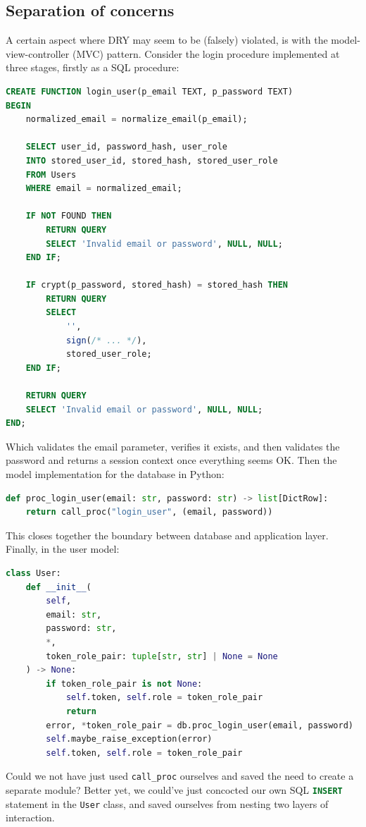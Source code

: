 \documentclass[journal]{IEEEtran}
\begin{document}
	\subsection{Separation of concerns}
	
	A certain aspect where DRY may seem to be (falsely) violated, is with the model-view-controller (MVC) pattern. Consider the login procedure implemented at three stages, firstly as a SQL procedure:
	
	\begin{lstlisting}[language=SQL]
CREATE FUNCTION login_user(p_email TEXT, p_password TEXT)
BEGIN
	normalized_email = normalize_email(p_email);
	
	SELECT user_id, password_hash, user_role
	INTO stored_user_id, stored_hash, stored_user_role
	FROM Users
	WHERE email = normalized_email;
	
	IF NOT FOUND THEN
		RETURN QUERY
		SELECT 'Invalid email or password', NULL, NULL;
	END IF;
	
	IF crypt(p_password, stored_hash) = stored_hash THEN
		RETURN QUERY
		SELECT
			'',
			sign(/* ... */),
			stored_user_role;
	END IF;
	
	RETURN QUERY
	SELECT 'Invalid email or password', NULL, NULL;
END;
	\end{lstlisting}
	
	Which validates the email parameter, verifies it exists, and then validates the password and returns a session context once everything seems OK. Then the model implementation for the database in Python:
	
	\begin{lstlisting}[language=Python]
def proc_login_user(email: str, password: str) -> list[DictRow]:
	return call_proc("login_user", (email, password))
	\end{lstlisting}
	
	This closes together the boundary between database and application layer. Finally, in the user model:
	\newpage
	\begin{lstlisting}[language=Python]
class User:
	def __init__(
		self,
		email: str,
		password: str,
		*,
		token_role_pair: tuple[str, str] | None = None
	) -> None:
		if token_role_pair is not None:
			self.token, self.role = token_role_pair
			return
		error, *token_role_pair = db.proc_login_user(email, password)
		self.maybe_raise_exception(error)
		self.token, self.role = token_role_pair
	\end{lstlisting}
	
	Could we not have just used \lstinline|call_proc| ourselves and saved the need to create a separate module? Better yet, we could've just concocted our own SQL \lstinline[language=SQL]|INSERT| statement in the \lstinline|User| class, and saved ourselves from nesting two layers of interaction.
	
\end{document}
